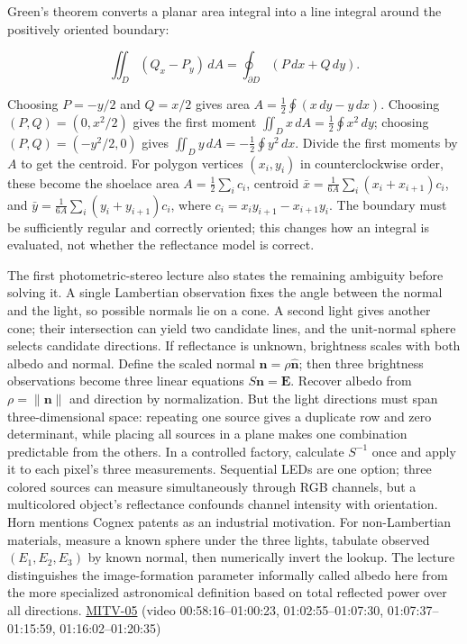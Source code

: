 Green's theorem converts a planar area integral into a line integral around the positively oriented boundary:

\[
\iint_D (Q_x-P_y)\,dA=\oint_{\partial D}(P\,dx+Q\,dy).
\]

Choosing \(P=-y/2\) and \(Q=x/2\) gives area \(A=\tfrac12\oint(x\,dy-y\,dx)\). Choosing \((P,Q)=(0,x^2/2)\) gives the first moment \(\iint_Dx\,dA=\tfrac12\oint x^2\,dy\); choosing \((P,Q)=(-y^2/2,0)\) gives \(\iint_Dy\,dA=-\tfrac12\oint y^2\,dx\). Divide the first moments by \(A\) to get the centroid. For polygon vertices \((x_i,y_i)\) in counterclockwise order, these become the shoelace area \(A=\tfrac12\sum_i c_i\), centroid \(\bar x=\frac{1}{6A}\sum_i(x_i+x_{i+1})c_i\), and \(\bar y=\frac{1}{6A}\sum_i(y_i+y_{i+1})c_i\), where \(c_i=x_i y_{i+1}-x_{i+1}y_i\). The boundary must be sufficiently regular and correctly oriented; this changes how an integral is evaluated, not whether the reflectance model is correct.

The first photometric-stereo lecture also states the remaining ambiguity before solving it. A single Lambertian observation fixes the angle between the normal and the light, so possible normals lie on a cone. A second light gives another cone; their intersection can yield two candidate lines, and the unit-normal sphere selects candidate directions. If reflectance is unknown, brightness scales with both albedo and normal. Define the scaled normal \(\mathbf{n}=\rho\hat{\mathbf n}\); then three brightness observations become three linear equations \(S\mathbf n=\mathbf E\). Recover albedo from \(\rho=\|\mathbf n\|\) and direction by normalization. But the light directions must span three-dimensional space: repeating one source gives a duplicate row and zero determinant, while placing all sources in a plane makes one combination predictable from the others. In a controlled factory, calculate \(S^{-1}\) once and apply it to each pixel's three measurements. Sequential LEDs are one option; three colored sources can measure simultaneously through RGB channels, but a multicolored object's reflectance confounds channel intensity with orientation. Horn mentions Cognex patents as an industrial motivation. For non-Lambertian materials, measure a known sphere under the three lights, tabulate observed \((E_1,E_2,E_3)\) by known normal, then numerically invert the lookup. The lecture distinguishes the image-formation parameter informally called albedo here from the more specialized astronomical definition based on total reflected power over all directions. \hyperref[04-visual-computing-ii-ch036]{MITV-05} (video 00:58:16--01:00:23, 01:02:55--01:07:30, 01:07:37--01:15:59, 01:16:02--01:20:35)

